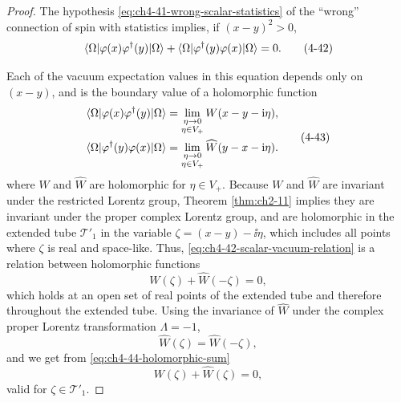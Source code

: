 \begin{proof}

The hypothesis \eqref{eq:ch4-41-wrong-scalar-statistics} of the “wrong” connection of spin with statistics
implies, if $(x-y)^2>0$,
\begin{equation}
  \langle \Omega\rvert\varphi(x)\varphi^\dagger(y)\lvert \Omega\rangle
  +\langle \Omega\rvert\varphi^\dagger(y)\varphi(x)\lvert \Omega\rangle=0.
  \tag{4-42}\label{eq:ch4-42-scalar-vacuum-relation}
\end{equation}

Each of the vacuum expectation values in this equation depends only on
$(x-y)$, and is the boundary value of a holomorphic function
\begin{equation}
\begin{aligned}
  \langle \Omega\rvert\varphi(x)\varphi^\dagger(y)\lvert \Omega\rangle
  &=\lim_{\substack{\eta\to0\\\eta\in V_+}}
    W(x-y-\mathrm{i}\eta),\\
  \langle \Omega\rvert\varphi^\dagger(y)\varphi(x)\lvert \Omega\rangle
  &=\lim_{\substack{\eta\to0\\\eta\in V_+}}
  \widehat W(y-x-\mathrm{i}\eta).
\end{aligned}
  \tag{4-43}\label{eq:ch4-43-holomorphic-boundaries}
\end{equation}
where $W$ and $\widehat W$ are holomorphic for $\eta\in V_+$.  Because $W$
and $\widehat W$ are invariant under the restricted Lorentz group, Theorem
\ref{thm:ch2-11} implies they are invariant under the proper complex Lorentz group, and
are holomorphic in the extended tube $\mathcal T'_1$ in the variable
$\zeta=(x-y)-\ii\eta$, which includes all points where $\zeta$ is real and
space-like.  Thus, \eqref{eq:ch4-42-scalar-vacuum-relation} is a relation between holomorphic functions
\begin{equation}
  W(\zeta)+\widehat W(-\zeta)=0,
  \tag{4-44}\label{eq:ch4-44-holomorphic-sum}
\end{equation}
which holds at an open set of real points of the extended tube and therefore
throughout the extended tube.  Using the invariance of $\widehat W$ under the
complex proper Lorentz transformation $\Lambda=-1$,
\begin{equation}
  \widehat W(\zeta)=\widehat W(-\zeta),
  \tag{4-45}\label{eq:ch4-45-hat-w-invariance}
\end{equation}
and we get from \eqref{eq:ch4-44-holomorphic-sum}
\begin{equation}
  W(\zeta)+\widehat W(\zeta)=0,
  \tag{4-46}\label{eq:ch4-46-holomorphic-zero}
\end{equation}
valid for $\zeta\in\mathcal T'_1$.


\end{proof}
